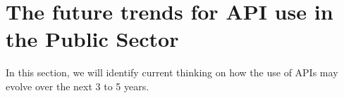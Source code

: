\chapter{The future trends for API use in the Public Sector}

\ifpdf
    \graphicspath{{Chapter4/Figs/Raster/}{Chapter4/Figs/PDF/}{Chapter4/Figs/}}
\else
    \graphicspath{{Chapter4/Figs/Vector/}{Chapter4/Figs/}}
\fi

In this section, we will identify current thinking on how the use of APIs may
evolve over the next 3 to 5 years.
